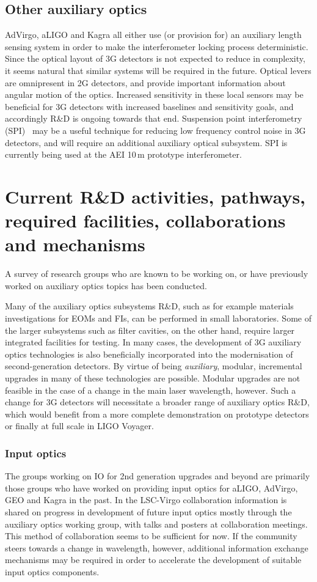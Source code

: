 \subsection{Other auxiliary optics}
AdVirgo, aLIGO and Kagra all either use (or provision for) an auxiliary length sensing system in order to make the interferometer locking process deterministic. Since the optical layout of 3G detectors is not expected to reduce in complexity, it seems natural that similar systems will be required in the future. Optical levers are  omnipresent in 2G detectors, and provide important information about angular motion of the optics. Increased sensitivity in these local sensors may be beneficial for 3G detectors with increased baselines and sensitivity goals, and accordingly R\&D is ongoing towards that end. Suspension point interferometry (SPI)~\cite{SPI} may be a useful technique for reducing low frequency control noise in 3G detectors, and will require an additional auxiliary optical subsystem. SPI is currently being used at the AEI 10\,m prototype interferometer.   

\section{Current R\&D activities, pathways, required facilities, collaborations\\ and mechanisms}
A survey of research groups who are known to be working on, or have previously worked on auxiliary optics topics has been conducted\cite{AuxActivitiesTable}.

Many of the auxiliary optics subsystems R\&D, such as for example materials investigations for EOMs and FIs, can be performed in small laboratories. 
Some of the larger subsystems such as filter cavities, on the other hand, require larger integrated facilities for testing. In many cases, the development of 3G auxiliary optics technologies is also beneficially incorporated into the modernisation of second-generation detectors. By virtue of being \emph{auxiliary}, modular, incremental upgrades in many of these technologies are possible. Modular upgrades are not feasible in the case of a change in the main laser wavelength, however. Such a change for 3G detectors will necessitate a broader range of auxiliary optics R\&D, which would benefit from a more complete demonstration on prototype detectors or finally at full scale in LIGO Voyager.

\subsubsection{\bf Input optics} The groups working on IO for 2nd generation upgrades and beyond are primarily those groups who have worked on providing input optics for aLIGO, AdVirgo, GEO and Kagra in the past. In the LSC-Virgo collaboration information is shared on progress in development of future input optics mostly through the auxiliary optics working group, with talks and posters at collaboration meetings. This method of collaboration seems to be sufficient for now. If the community steers towards a change in wavelength, however, additional information exchange mechanisms may be required in order to accelerate the development of suitable input optics components.

